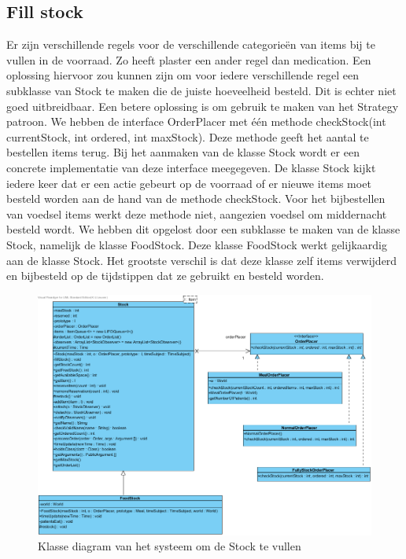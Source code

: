 \documentclass[a4paper]{article}
\begin{document}
\subsection{Fill stock}

Er zijn verschillende regels voor de verschillende categorie\"en van items bij te vullen in de voorraad. Zo heeft plaster een ander regel dan medication. Een oplossing hiervoor zou kunnen zijn om voor iedere verschillende regel een subklasse van Stock te maken die de juiste hoeveelheid besteld. Dit is echter niet goed uitbreidbaar. Een betere oplossing is om gebruik te maken van het Strategy patroon. We hebben de interface OrderPlacer met \'e\'en methode checkStock(int currentStock, int ordered, int maxStock). Deze methode geeft het aantal te bestellen items terug. Bij het aanmaken van de klasse Stock wordt er een concrete implementatie van deze interface meegegeven. De klasse Stock kijkt iedere keer dat er een actie gebeurt op de voorraad of er nieuwe items moet besteld worden aan de hand van de methode checkStock. Voor het bijbestellen van voedsel items werkt deze methode niet, aangezien voedsel om middernacht besteld wordt. We hebben dit opgelost door een subklasse te maken van de klasse Stock, namelijk de klasse FoodStock. Deze klasse FoodStock werkt gelijkaardig aan de klasse Stock. Het grootste verschil is dat deze klasse zelf items verwijderd en bijbesteld op de tijdstippen dat ze gebruikt en besteld worden.

\begin{figure}[h]
\centering
\includegraphics[width=\textwidth]{Pictures/StockOrder}
\caption{Klasse diagram van het systeem om de Stock te vullen}
\label{fig:StockOrder}
\end{figure}
\end{document}
